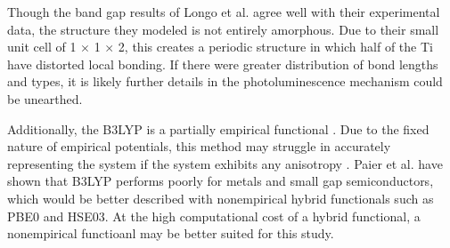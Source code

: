 \documentclass[3p,review,12pt]{elsarticle}
\begin{document}
\par

Though the band gap results of Longo et al. agree well with their experimental data, the structure they modeled is not entirely amorphous. Due to their small unit cell of 1 $\times$ 1 $\times$ 2, this creates a periodic structure in which half of the Ti have distorted local bonding. If there were greater distribution of bond lengths and types, it is likely further details in the photoluminescence mechanism could be unearthed.
\par

Additionally, the B3LYP is a partially empirical functional \cite{Paier2007}. Due to the fixed nature of empirical potentials, this method may struggle in accurately representing the system if the system exhibits any anisotropy \cite{Hohl1991}. Paier et al. \cite{Paier2007} have shown that B3LYP performs poorly for metals and small gap semiconductors, which would be better described with nonempirical hybrid functionals such as PBE0 and HSE03. At the high computational cost of a hybrid functional, a nonempirical functioanl may be better suited for this study.
\end{document}
